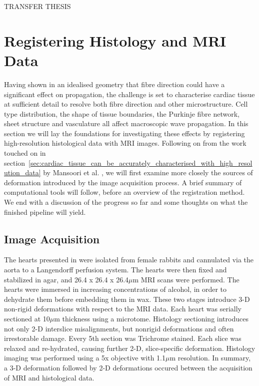 TRANSFER THESIS
\section{Registering Histology and MRI Data} %

\label{cha:registering_histology_and_mri_data}
  Having shown in an idealised geometry that fibre direction could have a significant effect on propagation, the challenge is set to characterise cardiac tissue at sufficient detail to resolve both fibre direction and other microstructure. Cell type distribution, the shape of tissue boundaries, the Purkinje fibre network, sheet structure and vasculature all affect macroscopic wave propagation. In this section we will lay the foundations for investigating these effects by registering high-resolution histological data with MRI images. Following on from the work touched on in section~\ref{sec:cardiac_tissue_can_be_accurately_characterised_with_high_resolution_data} by Mansoori et al. \cite{Mansoori:2007p221}, we will first examine more closely the sources of deformation introduced by the image acquisition process. A brief summary of computational tools will follow, before an overview of the registration method. We end with a discussion of the progress so far and some thoughts on what the finished pipeline will yield.
  
  \subsection{Image Acquisition} %
  \label{sec:image_acquisition}
    The hearts presented in \cite{Burton:2006p100} were isolated from female rabbits and cannulated via the aorta to a Langendorff perfusion system. The hearts were then fixed and stabilized in agar, and 26.4 x 26.4 x 26.4$\mu$m MRI scans were performed. The hearts were immersed in increasing concentrations of alcohol, in order to dehydrate them before embedding them in wax. These two stages introduce 3-D non-rigid deformations with respect to the MRI data. Each heart was serially sectioned at 10$\mu$m thickness using a microtome. Histology sectioning introduces not only 2-D interslice misalignments, but nonrigid deformations and often irrestorable damage. Every 5th section was Trichrome stained. Each slice was relaxed and re-hydrated, causing further 2-D, slice-specific deformation. Histology imaging was performed using a 5x objective with 1.1$\mu$m resolution. In summary, a 3-D deformation followed by 2-D deformations occured between the acquisition of MRI and histological data.
    

